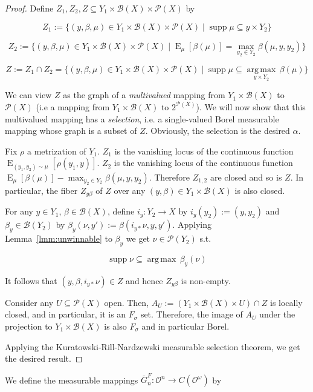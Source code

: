 \documentclass[11pt]{article}
\theoremstyle{definition}
\theoremstyle{plain}
\newcommand{\Argmax}[1]{\underset{#1}{\operatorname{arg\,max}}\,}
\DeclareMathOperator{\E}{E}
\newcommand{\PM}{\mathcal{P}}
\DeclareMathOperator{\Sp}{supp}
\newcommand{\Ob}{\mathcal{O}}
\newcommand{\OO}{\Ob^\omega}
\newcommand{\Gm}{\mathcal{B}}
\newcommand{\CO}{C(\OO)}
\begin{document}
\begin{proof}

Define ${Z_1, Z_2, Z \subseteq Y_1 \times \Gm(X) \times \PM(X)}$ by

$${Z_1:=\{(y,\beta,\mu) \in Y_1 \times \Gm(X) \times \PM(X) \mid \Sp \mu \subseteq y \times Y_2\}}$$

$${Z_2:=\{(y,\beta,\mu) \in Y_1 \times \Gm(X) \times \PM(X) \mid \E_\mu[\beta(\mu)] = \max_{y_2 \in Y_2} \beta(\mu,y,y_2)\}}$$

$${Z:=Z_1 \cap Z_2 =\{(y,\beta,\mu) \in Y_1 \times \Gm(X) \times \PM(X) \mid \Sp \mu \subseteq \Argmax{y \times Y_2} \beta(\mu)\}}$$

We can view ${Z}$ as the graph of a \emph{multivalued} mapping from ${Y_1 \times \Gm(X)}$ to ${\PM(X)}$ (i.e a mapping from ${Y_1 \times \Gm(X)}$ to $2^{\PM(X)}$). We will now show that this multivalued mapping has a \emph{selection}, i.e. a single-valued Borel measurable mapping whose graph is a subset of $Z$. Obviously, the selection is the desired ${\alpha}$.

Fix $\rho$ a metrization of $Y_1$. $Z_1$ is the vanishing locus of the continuous function $\E_{(y_1, y_2) \sim \mu}[\rho(y_1,y)]$. $Z_2$ is the vanishing locus of the continuous function $\E_\mu[\beta(\mu)] - \max_{y_2 \in Y_2} \beta(\mu,y,y_2)$. Therefore $Z_{1,2}$ are closed and so is $Z$. In particular, the fiber ${Z_{y\beta}}$ of ${Z}$ over any ${(y,\beta) \in Y_1 \times \Gm(X)}$ is also closed. 

For any ${y \in Y_1}$, ${\beta \in \Gm(X)}$, define ${i_y: Y_2 \rightarrow X}$ by ${i_y(y_2):=(y,y_2)}$ and ${\beta_y \in \Gm(Y_{2})}$ by $\beta_y(\nu,y'):=\beta(i_{y*}\nu,y,y')$. Applying Lemma~\ref{lmm:unwinnable} to ${\beta_y}$ we get ${\nu \in \PM(Y_2)}$ s.t.

$$\Sp \nu \subseteq \Argmax{} \beta_y(\nu)$$

It follows that ${(y,\beta,i_{y*}\nu) \in Z}$ and hence ${Z_{y\beta}}$ is non-empty.

Consider any ${U \subseteq \PM(X)}$ open. Then, ${A_U:=(Y_{1} \times \Gm(X) \times U) \cap Z}$ is locally closed, and in particular, it is an ${F_\sigma}$ set. Therefore, the image of ${A_U}$ under the projection to ${Y_{1} \times \Gm(X)}$ is also ${F_\sigma}$ and in particular Borel. 

Applying the Kuratowski-Rill-Nardzewski measurable selection theorem, we get the desired result.
\end{proof}

We define the measurable mappings $\bar{G}^F_n: \Ob^n \rightarrow \CO$ by
\end{document}
